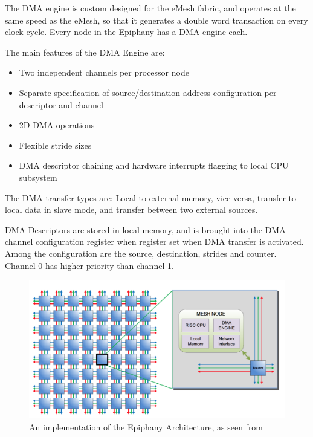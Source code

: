 The DMA engine is custom designed for the eMesh fabric, and operates at the same speed as the eMesh, so that it generates a double word transaction on every clock cycle.
Every node in the Epiphany has a DMA engine each.

The main features of the DMA Engine are: 
\begin{itemize}
    \item Two independent channels per processor node
    \item Separate specification of source/destination address configuration per descriptor and channel
    \item 2D DMA operations
    \item Flexible stride sizes
    \item DMA descriptor chaining and hardware interrupts flagging to local CPU subsystem
\end{itemize}

The DMA transfer types are: Local to external memory, vice versa, transfer to local data in slave mode, and transfer between two external sources.

DMA Descriptors are stored in local memory, and is brought into the DMA channel configuration register when register set when DMA transfer is activated.
Among the configuration are the source, destination, strides and counter.
Channel 0 has higher priority than channel 1.

\begin{figure}[h!]
    \centering
    \includegraphics[width=1\textwidth]{Figures/DMA/AdaptevaEpiphany}
    \caption{An implementation of the Epiphany Architecture, as seen from \cite{epiphany}}
    \label{fig:AdaptevaEpiphany}
\end{figure}


